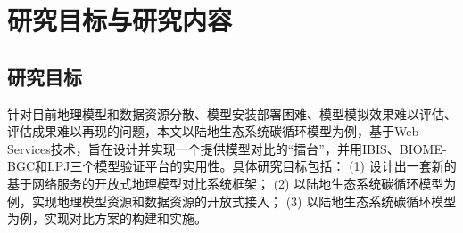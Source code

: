 \section{研究目标与研究内容}

\subsection{研究目标}
针对目前地理模型和数据资源分散、模型安装部署困难、模型模拟效果难以评估、评估成果难以再现的问题，本文以陆地生态系统碳循环模型为例，基于Web Services技术，旨在设计并实现一个提供模型对比的“擂台”，并用IBIS、BIOME-BGC和LPJ三个模型验证平台的实用性。具体研究目标包括：
(1)	设计出一套新的基于网络服务的开放式地理模型对比系统框架；
(2)	以陆地生态系统碳循环模型为例，实现地理模型资源和数据资源的开放式接入； 
(3)	以陆地生态系统碳循环模型为例，实现对比方案的构建和实施。



